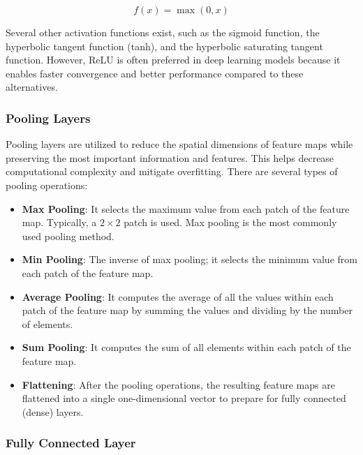 \begin{equation}
  f(x) = \max(0, x)
\end{equation}

Several other activation functions exist, such as the sigmoid function, the hyperbolic tangent function (tanh), and the hyperbolic saturating tangent function. However, ReLU is often preferred in deep learning models because it enables faster convergence and better performance compared to these alternatives.

\subsubsection{Pooling Layers}

Pooling layers are utilized to reduce the spatial dimensions of feature maps while preserving the most important information and features. This helps decrease computational complexity and mitigate overfitting. There are several types of pooling operations:

\begin{itemize}
  \item \textbf{Max Pooling}:
        It selects the maximum value from each patch of the feature map. Typically, a $2 \times 2$ patch is used. Max pooling is the most commonly used pooling method.

  \item \textbf{Min Pooling}:
        The inverse of max pooling; it selects the minimum value from each patch of the feature map.

  \item \textbf{Average Pooling}:
        It computes the average of all the values within each patch of the feature map by summing the values and dividing by the number of elements.

  \item \textbf{Sum Pooling}:
        It computes the sum of all elements within each patch of the feature map.

  \item \textbf{Flattening}:
        After the pooling operations, the resulting feature maps are flattened into a single one-dimensional vector to prepare for fully connected (dense) layers.
\end{itemize}

\subsubsection{Fully Connected Layer}

